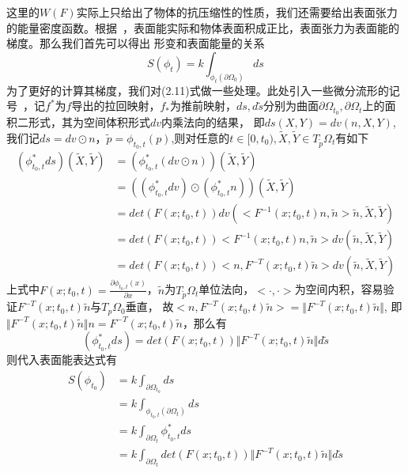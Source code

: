 这里的$W(F)$实际上只给出了物体的抗压缩性的性质，我们还需要给出表面张力的能量密度函数。根据~\cite{popinet2018numerical}，表面能实际和物体表面积成正比，表面张力为表面能的梯度。那么我们首先可以得出
形变和表面能量的关系
\begin{equation}
    S(\phi_t) = k\int_{\phi_t (\partial \Omega_0)} ds
\end{equation}
为了更好的计算其梯度，我们对(2.11)式做一些处理。此处引入一些微分流形的记号~\cite{lee2013smooth}，记$f^*$为$f$导出的拉回映射，$f_*$为推前映射，$ds,d\tilde{s}$分别为曲面$\partial \Omega_{t_0}, \partial \Omega_{t}$上的面积二形式，其为空间体积形式$dv$内乘法向的结果，
即$ds(X,Y) = dv(n,X,Y)$,我们记$ds = dv\odot n$，$ \tilde{p} = \phi_{t_0,t}(p)$,则对任意的$t \in[0, t_0),\tilde{X},\tilde{Y}\in T_{\tilde{p}}\Omega_t$有如下
\begin{equation}
    \begin{split}
        (\phi_{t_0,t}^*ds) (\tilde{X},\tilde{Y})& = (\phi_{t_0,t}^* (dv \odot n))(\tilde{X},\tilde{Y})\\
        &= ((\phi_{t_0,t}^* dv)\odot(\phi_{t_0,t}^* n))(\tilde{X},\tilde{Y})\\
        &= det(F(x;t_0,t))dv (<F^{-1}(x;t_0,t)n,\tilde{n}>\tilde{n} ,\tilde{X},\tilde{Y})\\
        &= det(F(x;t_0,t))<F^{-1}(x;t_0,t)n,\tilde{n}> dv(\tilde{n} ,\tilde{X},\tilde{Y})\\
        &= det(F(x;t_0,t))<n,F^{-T}(x;t_0,t)\tilde{n}>dv(\tilde{n} ,\tilde{X},\tilde{Y})
    \end{split}
\end{equation}
上式中$F(x;t_0,t) = \frac{\partial \phi_{t_0,t}(x)}{\partial x}$，$\tilde{n}$为$T_{\tilde{p}}\Omega_t$单位法向，$<\cdot,\cdot>$为空间内积，容易验证$F^{-T}(x;t_0,t)\tilde{n}$与$T_p\Omega_0$垂直，
故$<n,F^{-T}(x;t_0,t)\tilde{n}> = \Vert F^{-T}(x;t_0,t)\tilde{n}\Vert$, 即$\Vert F^{-T}(x;t_0,t)\tilde{n}\Vert n = F^{-T}(x;t_0,t)\tilde{n}$，那么有
$$(\phi_{t_0,t}^*ds) = det(F(x;t_0,t)) \Vert F^{-T}(x;t_0,t)\tilde{n}\Vert d\tilde{s}$$
则代入表面能表达式有
\begin{equation}
    \begin{split}
        S(\phi_{t_0}) &= k  \int_{\partial\Omega_{t_0}}ds\\
        &= k \int_{\phi_{t_0,t}(\partial\Omega_{t})} ds\\
        &= k \int_{\partial \Omega_t}  \phi_{t_0,t}^* ds\\
        &= k \int_{\partial \Omega_t} det(F(x;t_0,t)) \Vert F^{-T}(x;t_0,t)\tilde{n}\Vert d\tilde{s}\nonumber\\
    \end{split}
\end{equation}

